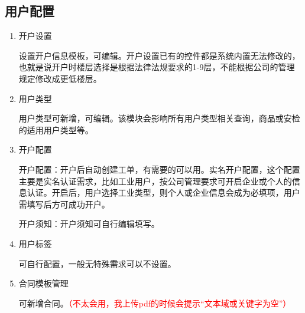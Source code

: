 \documentclass[UTF8]{ctexart}
\begin{document}
\subsection{用户配置}
\begin{enumerate}
	\item 开户设置
	
	设置开户信息模板，可编辑。开户设置已有的控件都是系统内置无法修改的，也就是说开户时楼层选择是根据法律法规要求的1-9层，不能根据公司的管理规定修改成更低楼层。
	
	\item 用户类型
	
	用户类型可新增，可编辑。该模块会影响所有用户类型相关查询，商品或安检的适用用户类型等。
	
	\item 开户配置
	
	开户配置：开户后自动创建工单，有需要的可以用。实名开户配置，这个配置主要是实名认证需求，比如工业用户，按公司管理要求可开启企业或个人的信息认证。开启后，用户选择工业类型，则个人或企业信息会成为必填项，用户需填写后方可成功开户。
	
	开户须知：开户须知可自行编辑填写。
	
	\item 用户标签
	
	可自行配置，一般无特殊需求可以不设置。
	
	\item 合同模板管理
	
	可新增合同。\textcolor{red}{（不太会用，我上传pdf的时候会提示“文本域或关键字为空”）}	
	
\end{enumerate}
\end{document}
